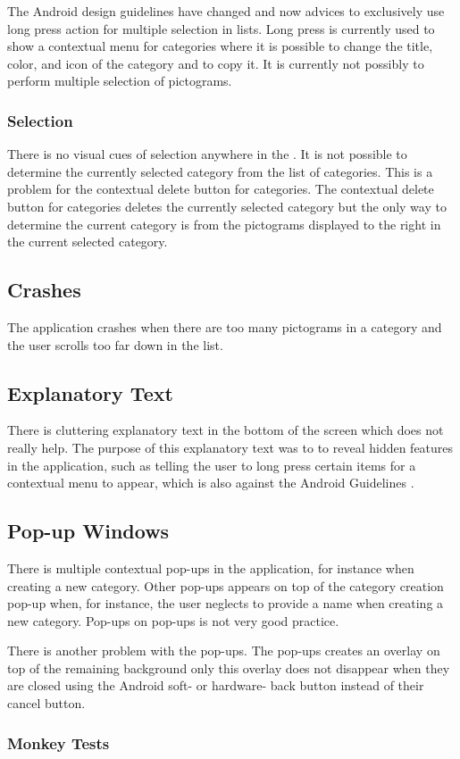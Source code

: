 The Android design guidelines have changed and now advices to exclusively use long press action for multiple selection in lists. Long press is currently used to show a contextual menu for categories where it is possible to change the title, color, and icon of the category and to copy it. It is currently not possibly to perform multiple selection of pictograms. 

\subsubsection{Selection}

There is no visual cues of selection anywhere in the \ct. It is not possible to determine the currently selected category from the list of categories. This is a problem for the contextual delete button for categories. The contextual delete button for categories deletes the currently selected category but the only way to determine the current category is from the pictograms displayed to the right in the current selected category. 

\subsection{Crashes}

The application crashes when there are too many pictograms in a category and the user scrolls too far down in the list. 

\subsection{Explanatory Text}

There is cluttering explanatory text in the bottom of the screen which does not really help. The purpose of this explanatory text was to to reveal hidden features in the application, such as telling the user to long press certain items for a contextual menu to appear, which is also against the Android Guidelines \parencite{android_guidelines_longpress}.

\subsection{Pop-up Windows}

There is multiple contextual pop-ups in the application, for instance when creating a new category. Other pop-ups appears on top of the category creation pop-up when, for instance, the user neglects to provide a name when creating a new category. Pop-ups on pop-ups is not very good practice.  

There is another problem with the pop-ups. The pop-ups creates an overlay on top of the remaining background only this overlay does not disappear when they are closed using the Android soft- or hardware- back button instead of their cancel button. 
 
\subsubsection{Monkey Tests}
